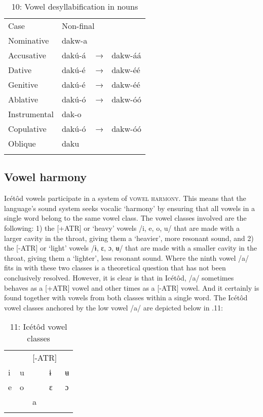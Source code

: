 \begin{table}
\caption{10: Vowel desyllabification in nouns}
\label{tab:2}


\begin{tabularx}{\textwidth}{XXXX}
\lsptoprule

Case & \multicolumn{3}{X}{ Non-final}\\
Nominative & dakw-a &  & \\
Accusative & dakú-á & → & dakw-áá\\
Dative & dakú-é & → & dakw-éé\\
Genitive & dakú-é & → & dakw-éé\\
Ablative & dakú-ó & → & dakw-óó\\
Instrumental & dak-o &  & \\
Copulative & dakú-ó & → & dakw-óó\\
Oblique & daku &  & \\
\lspbottomrule
\end{tabularx}
\end{table}

\subsection{Vowel harmony}


Icétôd vowels participate in a system of \textsc{vowel harmony}. This means that the language’s sound system seeks vocalic ‘harmony’ by ensuring that all vowels in a single word belong to the same vowel class. The vowel classes involved are the following: 1) the [+ATR] or ‘heavy’ vowels /i, e, o, u/ that are made with a larger cavity in the throat, giving them a ‘heavier’, more resonant sound, and 2) the [-ATR] or ‘light’ vowels /ɨ, ɛ, ɔ, ʉ/ that are made with a smaller cavity in the throat, giving them a ‘lighter’, less resonant sound. Where the ninth vowel /a/ fits in with these two classes is a theoretical question that has not been conclusively resolved. However, it is clear is that in Icétôd, /a/ sometimes behaves as a [+ATR] vowel and other times as a [-ATR] vowel. And it certainly is found together with vowels from both classes within a single word. The Icétôd vowel classes anchored by the low vowel /a/ are depicted below in .11:


\begin{table}
\caption{11: Icétôd vowel classes}
\label{tab:2}

\begin{tabularx}{\textwidth}{XXXXX}
\lsptoprule

\multicolumn{2}{X}{ \textsc{[+ATR]}} &  & \multicolumn{2}{X}{ \textsc{[-ATR]}}\\
 i & u &  & ɨ & ʉ\\
 e & o &  & ɛ & ɔ\\
&  & a &  & \\
\lspbottomrule
\end{tabularx}

\end{table}

